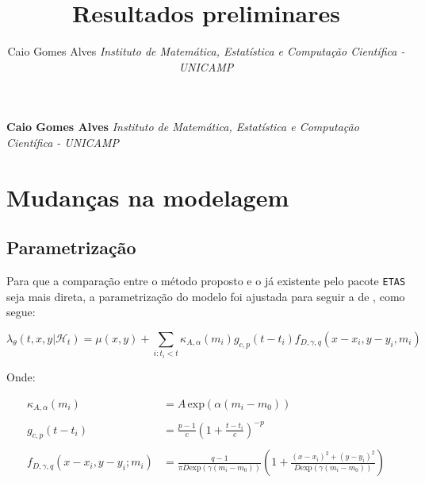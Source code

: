 \documentclass[11pt,]{article}
\title{Resultados preliminares  }
\author{\Large Caio Gomes
Alves\vspace{0.05in} \newline\normalsize\emph{Instituto de Matemática,
Estatística e Computação Científica - UNICAMP}  }
\date{}
\newcommand*{\authorfont}{\fontfamily{phv}\selectfont}
\begin{document}
%

{%
\setlength{\parindent}{0pt}
\thispagestyle{plain}
{\fontsize{18}{20}\selectfont\raggedright
\maketitle  %

}

{
   \vskip 13.5pt\relax \normalsize\fontsize{11}{12}
\textbf{\authorfont Caio Gomes Alves} \hskip 15pt \emph{\small Instituto
de Matemática, Estatística e Computação Científica - UNICAMP}   

}

}






\vskip -8.5pt



\noindent 

\hypertarget{mudanuxe7as-na-modelagem}{%
\section{Mudanças na modelagem}\label{mudanuxe7as-na-modelagem}}

\hypertarget{parametrizauxe7uxe3o}{%
\subsection{Parametrização}\label{parametrizauxe7uxe3o}}

Para que a comparação entre o método proposto e o já existente pelo
pacote \texttt{ETAS} seja mais direta, a parametrização do modelo foi
ajustada para seguir a de \cite{Jalilian_2019}, como segue:

\begin{equation}
\lambda_{\theta}(t,x,y|\mathcal{H}_{t}) = \mu(x,y) + \sum_{i: t_{i} < t}\kappa_{A,\alpha}(m_{i})g_{c,p}(t - t_{i})f_{D,\gamma,q}(x - x_{i}, y - y_{i}, m_{i})
\end{equation}

Onde:

\begin{align*}
\kappa_{A,\alpha}(m_{i}) &= A \, \mathrm{exp}\left(\alpha(m_{i} - m_{0})\right) \\ \\
g_{c,p}(t - t_{i}) &= \frac{p-1}{c}\left(1 + \frac{t - t_{i}}{c}\right)^{-p} \\ \\
f_{D,\gamma,q}(x - x_{i},y - y_{i}; m_{i}) &= \frac{q - 1}{\pi D \mathrm{exp}\left(\gamma(m_{i} - m_{0})\right)}\left(1 + \frac{(x - x_{i})^{2} + (y - y_{i})^{2}}{D \mathrm{exp}\left(\gamma(m_{i} - m_{0})\right)}\right)
\end{align*}
\end{document}
